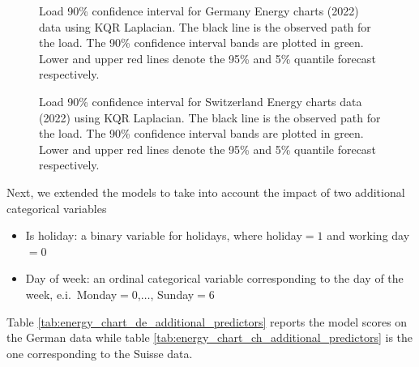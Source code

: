     \begin{figure}[!ht]
        \caption[Probabilistic forecast for load in Germany]{Load 90\% confidence interval for Germany Energy charts (2022) data using KQR Laplacian. The black line is the observed path for the load. The 90\% confidence interval bands are plotted in green. Lower and upper red lines denote the 95\% and 5\% quantile forecast respectively.}
        \label{fig:DE_load_CI}
    \end{figure}
    

    \begin{figure}[!ht]
        \caption[Probabilistic forecast for load in Switzerland]{Load 90\% confidence interval for Switzerland Energy charts data (2022) using KQR Laplacian. The black line is the observed path for the load. The 90\% confidence interval bands are plotted in green. Lower and upper red lines denote the 95\% and 5\% quantile forecast respectively.}
        \label{fig:CH_load_CI}
    \end{figure}
    
Next, we extended the models to take into account the impact of two additional categorical variables
\begin{itemize}
    \item Is holiday: a binary variable for holidays, where holiday$=1$ and working day$=0$
    \item Day of week: an ordinal categorical variable corresponding to the day of the week, e.i.\ Monday$=0$,$\dots$, Sunday$=6$
\end{itemize}
Table \ref{tab:energy_chart_de_additional_predictors} reports the model scores on the German data while table \ref{tab:energy_chart_ch_additional_predictors} is the one corresponding to the Suisse data.

